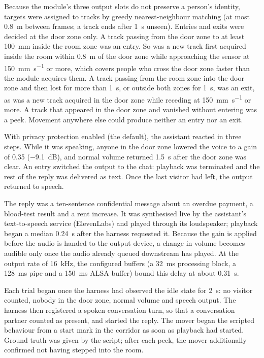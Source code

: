 Because the module's three output slots do not preserve a person's identity,
targets were assigned to tracks by greedy nearest-neighbour matching (at most
\SI{0.8}{\metre} between frames; a track ends after \SI{1}{\second} unseen).
Entries and exits were decided at the door zone only. A track passing from the
door zone to at least \SI{100}{\milli\metre} inside the room zone was an entry.
So was a new track first acquired inside the room within \SI{0.8}{\metre} of
the door zone while approaching the sensor at
\SI{150}{\milli\metre\per\second} or more, which covers people who cross the
door zone faster than the module acquires them. A track passing from the room
zone into the door zone and then lost for more than \SI{1}{\second}, or
outside both zones for \SI{1}{\second}, was an exit, as was a new track
acquired in the door zone while receding at \SI{150}{\milli\metre\per\second}
or more. A track that appeared in the door zone and vanished without entering
was a peek. Movement anywhere else could produce neither an entry nor an exit.

With privacy protection enabled (the default), the assistant reacted in three
steps. While it was speaking, anyone in the door zone lowered the voice to a
gain of 0.35 (\SI{-9.1}{\dB}), and normal volume returned \SI{1.5}{\second}
after the door zone was clear. An entry switched the output to the chat:
playback was terminated and the rest of the reply was delivered as text. Once
the last visitor had left, the output returned to speech.

The reply was a ten-sentence confidential message about an overdue payment, a
blood-test result and a rent increase. It was synthesised live by the
assistant's text-to-speech service (ElevenLabs) and played through its
loudspeaker; playback began a median \SI{0.24}{\second} after the harness
requested it. Because the gain is applied before the audio is handed to the
output device, a change in volume becomes audible only once the audio already
queued downstream has played. At the output rate of \SI{16}{\kilo\hertz}, the
configured buffers (a \SI{32}{\milli\second} processing block, a
\SI{128}{\milli\second} pipe and a \SI{150}{\milli\second} ALSA buffer) bound
this delay at about \SI{0.31}{\second}.

Each trial began once the harness had observed the idle state for
\SI{2}{\second}: no visitor counted, nobody in the door zone, normal volume and
speech output. The harness then registered a spoken conversation turn, so that
a conversation partner counted as present, and started the reply. The mover
began the scripted behaviour from a start mark in the corridor as soon as
playback had started. Ground truth was given by the script; after each peek,
the mover additionally confirmed not having stepped into the room.

